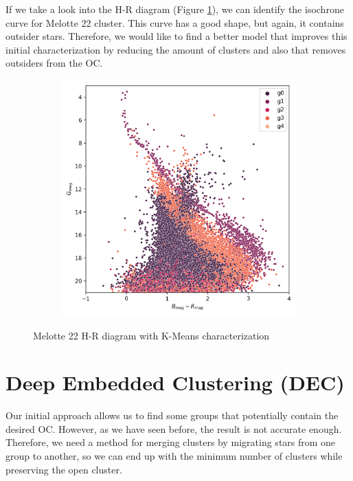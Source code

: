 \documentclass[11pt, a4paper, english]{book}
\begin{document}
If we take a look into the H-R diagram (Figure \ref{fig:kmeans_hr_diagram_melotte_22}),
we can identify the isochrone curve for Melotte 22 cluster.
This curve has a good shape, but again, it contains outsider stars.
Therefore, we would like to find a better model that improves this initial characterization
by reducing the amount of clusters and also that removes outsiders from the OC.

\begin{figure}[htbp]
  \centering
  \begin{subfigure}{0.5\textwidth}
    \centering
    \includegraphics[width=\textwidth]{../figures/melotte_22/kmeans_hr_diagram_melotte_22.png}
  \end{subfigure}
  \caption{Melotte 22 H-R diagram with K-Means characterization}
  \label{fig:kmeans_hr_diagram_melotte_22}
\end{figure}

\section{Deep Embedded Clustering (DEC)}
\label{sec:deep_embedding_clustering}

Our initial approach allows us to find some groups that potentially contain the desired OC.
However, as we have seen before, the result is not accurate enough.
Therefore, we need a method for merging clusters by migrating stars from one group to another,
so we can end up with the minimum number of clusters while preserving the open cluster.
\end{document}

